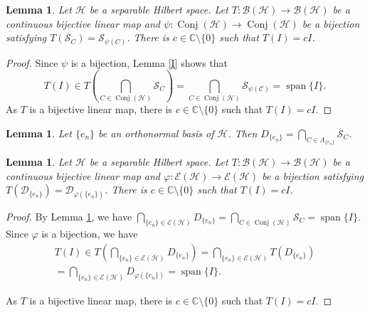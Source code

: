 \documentclass[11pt]{amsart}
\newtheorem{lemma}[theorem]{Lemma}
\theoremstyle{remark}
\newcommand{\BH}{\mathcal{B(H)}}
\newcommand{\cH}{{\mathcal{H}}}
\newcommand{\SC}{\mathcal{S}_C}
\newcommand{\Conj}{\operatorname{Conj}(\cH)}
\newcommand{\Span}{\operatorname{span}}
\begin{document}
\begin{lemma}\label{I2}
Let $\cH$ be a separable Hilbert space. Let $T: \BH \to \BH$ be a continuous bijective linear map  and $\psi: \Conj \to \Conj$ be a bijection satisfying $T(\SC) = {\mathcal{S}_{\psi(C)}}$. There is $c \in \mathbb{C} \setminus \{0\} $ such that $T(I)=cI$.
\end{lemma}
\begin{proof}
Since $\psi$ is a bijection,  Lemma \ref{I} shows that
\[
T(I) \in T( \bigcap_{C \in \Conj} \SC)=  \bigcap_{C \in \Conj} \mathcal{S_{\psi(C)}}=\Span\{I\}.
\]
As $T$ is a bijective linear map,  there is $c \in \mathbb{C} \setminus \{0\} $ such that $T(I)=cI$. 
\end{proof}

\begin{lemma}\cite[Lemma 1]{AOS}\label{L1}
Let $\{e_n\}$ be an orthonormal basis of $\cH$. Then 
$D_{\{e_n\}}=\bigcap_{C \in \Lambda_{\{e_n\}}} \mathcal{S}_{C}$.
\end{lemma}

\begin{lemma}\label{I3}
Let $\cH$ be a separable Hilbert space. Let $T: \BH \to \BH$ be a continuous bijective linear map  and  $\varphi: \mathcal{E}(\cH) \to \mathcal{E}(\cH)$ be a bijection satisfying $T(\mathcal{D}_{\{e_n\}}) = \mathcal{D}_{\varphi(\{e_n\})}$. There is $c \in \mathbb{C} \setminus \{0\} $ such that $T(I)=cI$.
\end{lemma}
\begin{proof}
By Lemma \ref{L1}, we have $\bigcap_{\{e_n\} \in \mathcal{E}(\cH)} D_{\{e_n\}}= \bigcap_{C \in \Conj} \SC=\Span\{I\}$. 
Since $\varphi$ is a bijection,  we have
\begin{multline*}
   T(I) \in T(\bigcap_{\{e_n\} \in \mathcal{E}(\cH)} D_{\{e_n\}})=  \bigcap_{\{e_n\} \in \mathcal{E}(\cH)} T(D_{\{e_n\}})\\= \bigcap_{\{e_n\} \in \mathcal{E}(\cH)} D_{\varphi(\{e_n\})}=\Span\{I\}. 
\end{multline*}


As $T$ is a bijective linear map,  there is $c \in \mathbb{C} \setminus \{0\} $ such that $T(I)=cI$. 
\end{proof}
\end{document}
